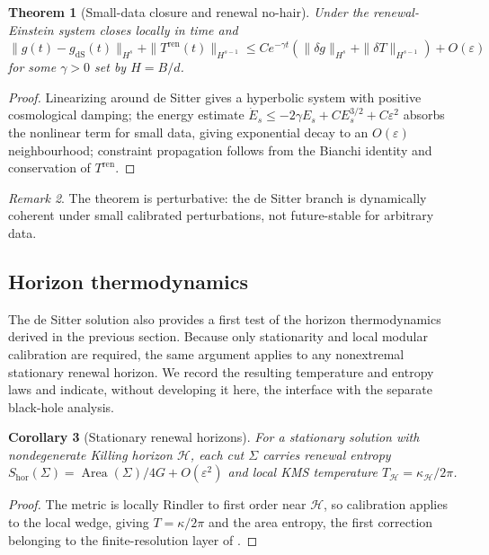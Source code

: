 \documentclass[11pt]{article}
\newtheorem{theorem}{Theorem}[section]
\newtheorem{corollary}[theorem]{Corollary}
\theoremstyle{definition}
\theoremstyle{remark}
\newtheorem{remark}[theorem]{Remark}
\newcommand{\eps}{\varepsilon}
\newcommand{\Area}{\operatorname{Area}}
\newcommand{\dS}{\mathrm{dS}}
\newcommand{\Tren}{T^{\mathrm{ren}}}
\newcommand{\hor}{\mathrm{hor}}
\begin{document}
\begin{theorem}[Small-data closure and renewal no-hair]
\label{thm:nohair}
Under  the renewal-Einstein system closes locally in time and
$\|g(t)-g_{\dS}(t)\|_{H^s}+\|\Tren(t)\|_{H^{s-1}}\le Ce^{-\gamma t}(\|\delta g\|_{H^s}
+\|\delta T\|_{H^{s-1}})+O(\eps)$ for some $\gamma>0$ set by $H=B/d$.
\end{theorem}

\begin{proof}
Linearizing  around de Sitter gives a hyperbolic system with
positive cosmological damping; the energy estimate
$\dot E_s\le-2\gamma E_s+CE_s^{3/2}+C\eps^2$ absorbs the nonlinear term for small
data, giving exponential decay to an $O(\eps)$ neighbourhood; constraint
propagation follows from the Bianchi identity and conservation of $\Tren$.
\end{proof}

\begin{remark}
The theorem is perturbative: the de Sitter branch is dynamically coherent under
small calibrated perturbations, not future-stable for arbitrary data.
\end{remark}

\subsection{Horizon thermodynamics}

The de Sitter solution also provides a first test of the horizon thermodynamics
derived in the previous section.  Because only stationarity and local modular
calibration are required, the same argument applies to any nonextremal
stationary renewal horizon.  We record the resulting temperature and entropy
laws and indicate, without developing it here, the interface with the separate
black-hole analysis.

\begin{corollary}[Stationary renewal horizons]
\label{cor:horizons}
For a stationary solution with nondegenerate Killing horizon $\mathcal H$, each cut
$\Sigma$ carries renewal entropy $S_{\hor}(\Sigma)=\Area(\Sigma)/4G+O(\eps^2)$ and
local KMS temperature $T_{\mathcal H}=\kappa_{\mathcal H}/2\pi$.
\end{corollary}

\begin{proof}
The metric is locally Rindler to first order near $\mathcal H$, so calibration
applies to the local wedge, giving $T=\kappa/2\pi$ and the area entropy, the first
correction belonging to the finite-resolution layer of .
\end{proof}
\end{document}
